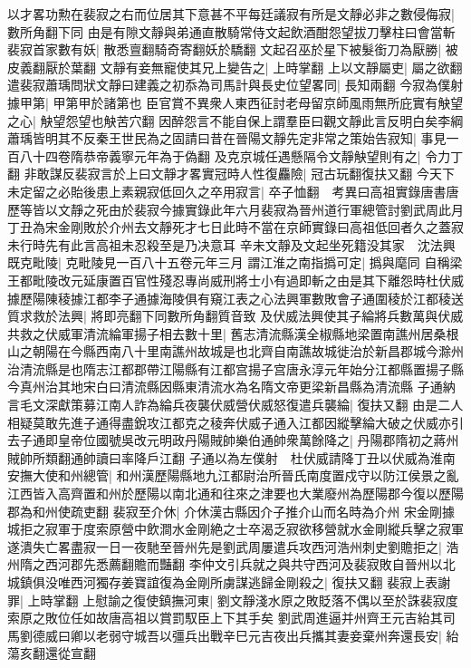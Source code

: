 以才畧功勲在裴寂之右而位居其下意甚不平每廷議寂有所是文靜必非之數侵侮寂|{
	數所角翻下同}
由是有隙文靜與弟通直散騎常侍文起飲酒酣怨望拔刀擊柱曰會當斬裴寂首家數有妖|{
	散悉亶翻騎奇寄翻妖於驕翻}
文起召巫於星下被髮銜刀為厭勝|{
	被皮義翻厭於葉翻}
文靜有妾無寵使其兄上變告之|{
	上時掌翻}
上以文靜屬吏|{
	屬之欲翻}
遣裴寂蕭瑀問狀文靜曰建義之初忝為司馬計與長史位望畧同|{
	長知兩翻}
今寂為僕射據甲第|{
	甲第甲於諸第也}
臣官賞不異衆人東西征討老母留京師風雨無所庇實有觖望之心|{
	觖望怨望也觖苦穴翻}
因醉怨言不能自保上謂羣臣曰觀文靜此言反明白矣李綱蕭瑀皆明其不反秦王世民為之固請曰昔在晉陽文靜先定非常之策始告寂知|{
	事見一百八十四卷隋恭帝義寧元年為于偽翻}
及克京城任遇懸隔令文靜觖望則有之|{
	令力丁翻}
非敢謀反裴寂言於上曰文靜才畧實冠時人性復麤險|{
	冠古玩翻復扶又翻}
今天下未定留之必貽後患上素親寂低回久之卒用寂言|{
	卒子恤翻　考異曰高祖實錄唐書唐歷等皆以文靜之死由於裴寂今據實錄此年六月裴寂為晉州道行軍總管討劉武周此月丁丑為宋金剛敗於介州去文靜死才七日此時不當在京師實錄曰高祖低回者久之蓋寂未行時先有此言高祖未忍殺至是乃决意耳}
辛未文靜及文起坐死籍没其家　沈法興既克毗陵|{
	克毗陵見一百八十五卷元年三月}
謂江淮之南指撝可定|{
	撝與麾同}
自稱梁王都毗陵改元延康置百官性殘忍專尚威刑將士小有過即斬之由是其下離怨時杜伏威據歷陽陳稜據江都李子通據海陵俱有窺江表之心法興軍數敗會子通圍稜於江都稜送質求救於法興|{
	將即亮翻下同數所角翻質音致}
及伏威法興使其子綸將兵數萬與伏威共救之伏威軍清流綸軍揚子相去數十里|{
	舊志清流縣漢全椒縣地梁置南譙州居桑根山之朝陽在今縣西南八十里南譙州故城是也北齊自南譙故城徙治於新昌郡城今滁州治清流縣是也隋志江都郡帶江陽縣有江都宫揚子宫唐永淳元年始分江都縣置揚子縣今真州治其地宋白曰清流縣因縣東清流水為名隋文帝更梁新昌縣為清流縣}
子通納言毛文深獻策募江南人詐為綸兵夜襲伏威營伏威怒復遣兵襲綸|{
	復扶又翻}
由是二人相疑莫敢先進子通得盡銳攻江都克之稜奔伏威子通入江都因縱擊綸大破之伏威亦引去子通即皇帝位國號吳改元明政丹陽賊帥樂伯通帥衆萬餘降之|{
	丹陽郡隋初之蔣州賊帥所類翻通帥讀曰率降戶江翻}
子通以為左僕射　杜伏威請降丁丑以伏威為淮南安撫大使和州總管|{
	和州漢歷陽縣地九江都尉治所晉氏南度置戍守以防江侯景之亂江西皆入高齊置和州於歷陽以南北通和往來之津要也大業廢州為歷陽郡今復以歷陽郡為和州使疏吏翻}
裴寂至介休|{
	介休漢古縣因介子推介山而名時為介州}
宋金剛據城拒之寂軍于度索原營中飲澗水金剛絶之士卒渴乏寂欲移營就水金剛縱兵擊之寂軍遂潰失亡畧盡寂一日一夜馳至晉州先是劉武周屢遣兵攻西河浩州刺史劉贍拒之|{
	浩州隋之西河郡先悉薦翻贍而豔翻}
李仲文引兵就之與共守西河及裴寂敗自晉州以北城鎮俱没唯西河獨存姜寶誼復為金剛所虜謀逃歸金剛殺之|{
	復扶又翻}
裴寂上表謝罪|{
	上時掌翻}
上慰諭之復使鎮撫河東|{
	劉文靜淺水原之敗貶落不偶以至於誅裴寂度索原之敗位任如故唐高祖以賞罰馭臣上下其手矣}
劉武周進逼并州齊王元吉紿其司馬劉德威曰卿以老弱守城吾以彊兵出戰辛巳元吉夜出兵攜其妻妾棄州奔還長安|{
	紿蕩亥翻還從宣翻}

